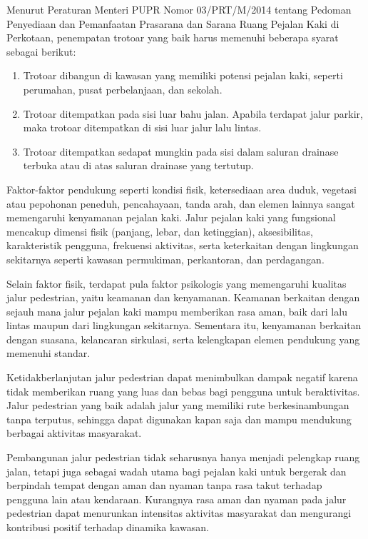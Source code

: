 \documentclass[../rumukota.tex]{subfiles}
\begin{document}
Menurut Peraturan Menteri PUPR Nomor 03/PRT/M/2014 tentang Pedoman Penyediaan dan Pemanfaatan Prasarana dan Sarana Ruang Pejalan Kaki di Perkotaan, penempatan trotoar yang baik harus memenuhi beberapa syarat sebagai berikut:
\begin{enumerate}
	\item Trotoar dibangun di kawasan yang memiliki potensi pejalan kaki, seperti perumahan, pusat perbelanjaan, dan sekolah.
	\item Trotoar ditempatkan pada sisi luar bahu jalan. Apabila terdapat jalur parkir, maka trotoar ditempatkan di sisi luar jalur lalu lintas.
	\item Trotoar ditempatkan sedapat mungkin pada sisi dalam saluran drainase terbuka atau di atas saluran drainase yang tertutup.
\end{enumerate}

Faktor-faktor pendukung seperti kondisi fisik, ketersediaan area duduk, vegetasi atau pepohonan peneduh, pencahayaan, tanda arah, dan elemen lainnya sangat memengaruhi kenyamanan pejalan kaki. Jalur pejalan kaki yang fungsional mencakup dimensi fisik (panjang, lebar, dan ketinggian), aksesibilitas, karakteristik pengguna, frekuensi aktivitas, serta keterkaitan dengan lingkungan sekitarnya seperti kawasan permukiman, perkantoran, dan perdagangan.

Selain faktor fisik, terdapat pula faktor psikologis yang memengaruhi kualitas jalur pedestrian, yaitu keamanan dan kenyamanan. Keamanan berkaitan dengan sejauh mana jalur pejalan kaki mampu memberikan rasa aman, baik dari lalu lintas maupun dari lingkungan sekitarnya. Sementara itu, kenyamanan berkaitan dengan suasana, kelancaran sirkulasi, serta kelengkapan elemen pendukung yang memenuhi standar.

Ketidakberlanjutan jalur pedestrian dapat menimbulkan dampak negatif karena tidak memberikan ruang yang luas dan bebas bagi pengguna untuk beraktivitas. Jalur pedestrian yang baik adalah jalur yang memiliki rute berkesinambungan tanpa terputus, sehingga dapat digunakan kapan saja dan mampu mendukung berbagai aktivitas masyarakat.

Pembangunan jalur pedestrian tidak seharusnya hanya menjadi pelengkap ruang jalan, tetapi juga sebagai wadah utama bagi pejalan kaki untuk bergerak dan berpindah tempat dengan aman dan nyaman tanpa rasa takut terhadap pengguna lain atau kendaraan. Kurangnya rasa aman dan nyaman pada jalur pedestrian dapat menurunkan intensitas aktivitas masyarakat dan mengurangi kontribusi positif terhadap dinamika kawasan.
\end{document}
